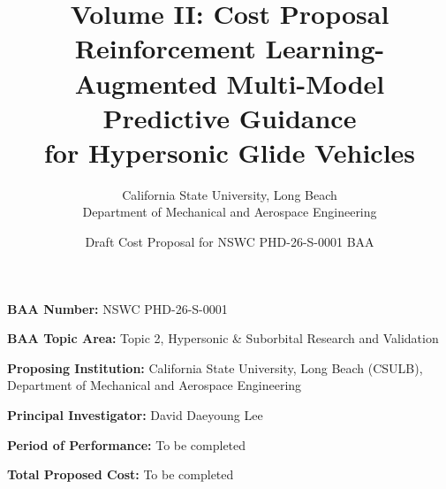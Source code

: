 \documentclass[12pt,letterpaper]{article}
\title{\textbf{Volume II: Cost Proposal}\\
Reinforcement Learning-Augmented Multi-Model Predictive Guidance\\for Hypersonic Glide Vehicles}
\author{
California State University, Long Beach\\
Department of Mechanical and Aerospace Engineering
}
\date{Draft Cost Proposal for NSWC PHD-26-S-0001 BAA}
\begin{document}
\maketitle

\noindent\textbf{BAA Number:} NSWC PHD-26-S-0001

\noindent\textbf{BAA Topic Area:} Topic 2, Hypersonic \& Suborbital Research and Validation

\noindent\textbf{Proposing Institution:} California State University, Long Beach (CSULB), Department of Mechanical and Aerospace Engineering

\noindent\textbf{Principal Investigator:} David Daeyoung Lee

\noindent\textbf{Period of Performance:} To be completed

\noindent\textbf{Total Proposed Cost:} To be completed






\end{document}
